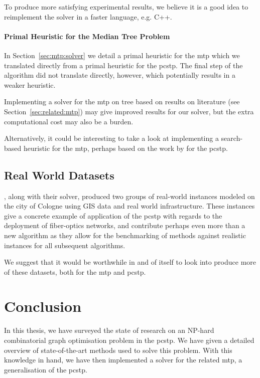 To produce more satisfying experimental results, we believe it is a good idea to reimplement
the solver in a faster language, e.g. C++.

\paragraph{Primal Heuristic for the Median Tree Problem}
In Section~\ref{sec:mtp:solver} we detail a primal heuristic for the \gls{mtp}
which we translated directly from a primal heuristic for the \gls{pcstp}.
The final step of the algorithm did not translate directly, however, which potentially
results in a weaker heuristic.

Implementing a solver for the \gls{mtp} on tree based on results on literature
(see Section~\ref{sec:related:mtp}) may give improved results for our solver,
but the extra computational cost may also be a burden.

Alternatively, it could be interesting to take a look at implementing a search-based
heuristic for the \gls{mtp}, perhaps based on the work by \citet{canuto2001local}
for the \gls{pcstp}.

\subsection{Real World Datasets}
\citet{ljubic2006algorithmic}, along with their solver, produced two groups of real-world
instances modeled on the city of Cologne using GIS data and real world infrastructure.
These instances give a concrete example of application of the \gls{pcstp} with regards
to the deployment of fiber-optics networks, and contribute perhaps even more than
a new algorithm as they allow for the benchmarking of methods against realistic instances
for all subsequent algorithms.

We suggest that it would be worthwhile in and of itself to look into produce more of these
datasets, both for the \gls{mtp} and \gls{pcstp}.

\section{Conclusion}\label{sec:con:con}
In this thesis, we have surveyed the state of research on
an NP-hard combinatorial graph optimisation problem in
the \acrlong{pcstp}. We have given a detailed overview of state-of-the-art
methods used to solve this problem.
With this knowledge in hand, we have then implemented a solver for the related
\acrlong{mtp}, a generalisation of the \gls{pcstp}.

